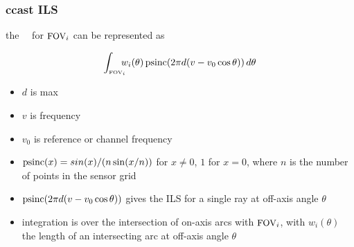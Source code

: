 \begin{frame}
\frametitle{ccast ILS}

the \cris\ \ils\ for $\mbox{\small FOV}_i$ can be represented as

\[\int_{\mbox{\tiny FOV}_i} \!\!\!\! w_i(\theta)\, \mbox{psinc}(2 \pi
                 d(v - v_0 \cos \theta ))\, d\theta \]


\begin{itemize}
  \item $d$ is max \opd
  \item $v$ is frequency
  \item $v_0$ is reference or channel frequency
  \item $\mbox{psinc}(x) = sin(x)/(n \sin(x/n))$ for $x \ne 0$,  $1$ for
    $x = 0$, where $n$ is the number of points in the sensor grid
   \item $\mbox{psinc}(2 \pi d(v - v_0 \cos \theta ))$ gives the ILS for a
    single ray at off-axis angle $\theta$
  \item integration is over the intersection of on-axis arcs with
    $\mbox{\small FOV}_i$, with $w_i(\theta)$ the length of an intersecting arc
    at off-axis angle $\theta$
\end{itemize}

\end{frame}
